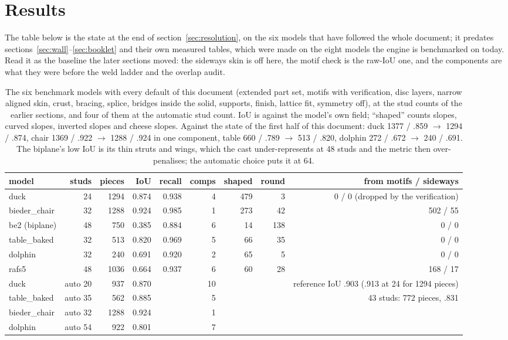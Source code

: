 \documentclass[10pt,a4paper]{article}
\begin{document}
\section{Results}
The table below is the state at the end of section~\ref{sec:resolution}, on the six models that have followed the whole document;
it predates sections~\ref{sec:wall}--\ref{sec:booklet} and their own measured tables, which were made on the eight models the
engine is benchmarked on today. Read it as the baseline the later sections moved: the sideways skin is off here, the motif check is
the raw-IoU one, and the components are what they were before the weld ladder and the overlap audit.
\begin{table}[H]
\centering\small
\begin{tabular}{lrrrrrrrr}
\toprule
model & studs & pieces & IoU & recall & comps & shaped & round & from motifs / sideways \\
\midrule
duck & 24 & 1294 & 0.874 & 0.938 & 4 & 479 & 3 & 0 / 0 (dropped by the verification) \\
bieder\_chair & 32 & 1288 & 0.924 & 0.985 & 1 & 273 & 42 & 502 / 55 \\
be2 (biplane) & 48 & 750 & 0.385 & 0.884 & 6 & 14 & 138 & 0 / 0 \\
table\_baked & 32 & 513 & 0.820 & 0.969 & 5 & 66 & 35 & 0 / 0 \\
dolphin & 32 & 240 & 0.691 & 0.920 & 2 & 65 & 5 & 0 / 0 \\
rafs5 & 48 & 1036 & 0.664 & 0.937 & 6 & 60 & 28 & 168 / 17 \\
\midrule
duck & auto 20 & 937 & 0.870 & & 10 & & & reference IoU .903 (.913 at 24 for 1294 pieces) \\
table\_baked & auto 35 & 562 & 0.885 & & 5 & & & 43 studs: 772 pieces, .831 \\
bieder\_chair & auto 32 & 1288 & 0.924 & & 1 & & & \\
dolphin & auto 54 & 922 & 0.801 & & 7 & & & \\
\bottomrule
\end{tabular}
\caption{The six benchmark models with every default of this document (extended part set, motifs with verification, disc layers,
narrow aligned skin, crust, bracing, splice, bridges inside the solid, supports, finish, lattice fit, symmetry off), at the stud
counts of the earlier sections, and four of them at the automatic stud count. IoU is against the model's own field; ``shaped'' counts
slopes, curved slopes, inverted slopes and cheese slopes. Against the state of the first half of this document: duck 1377 / .859
$\to$ 1294 / .874, chair 1369 / .922 $\to$ 1288 / .924 in one component, table 660 / .789 $\to$ 513 / .820, dolphin 272 / .672
$\to$ 240 / .691. The biplane's low IoU is its thin struts and wings, which the cast under-represents at 48 studs and the metric
then over-penalises; the automatic choice puts it at 64.}
\end{table}
\end{document}
